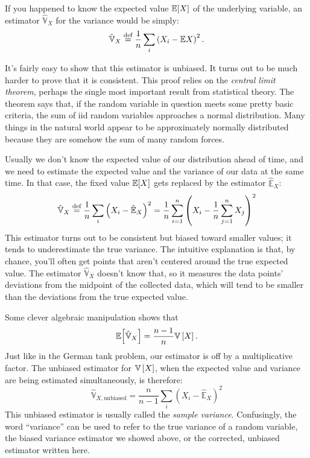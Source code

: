 If you happened to know the expected value $\mathbb{E}\!\left[{X}\right]$ of the underlying
variable, an estimator $\hat{\mathbb{V}}_X$ for the variance would be simply:
\begin{equation}
  \hat{\mathbb{V}}_X \stackrel{\text{def}}{=} \frac{1}{n} \sum_i \left( X_i - \mathbb{E}X \right)^2.
\end{equation}

It's fairly easy to show that this estimator is unbiased. It turns out to be
much harder to prove that it is consistent. This proof relies on the
\emph{central limit theorem}, perhaps the single most important result from
statistical theory. The theorem says that, if the random variable in question
meets some pretty basic criteria, the sum of iid random variables approaches a
normal distribution. Many things in the natural world appear to be
approximately normally distributed because they are somehow the sum of many
random forces.

Usually we don't know the expected value of our distribution ahead of time,
and we need to estimate the expected value and the variance of our data at the
same time. In that case, the fixed value $\mathbb{E}\!\left[{X}\right]$ gets replaced by the
estimator $\hat{\mathbb{E}}_X$:
\begin{equation}
\hat{\mathbb{V}}_X \stackrel{\text{def}}{=} \frac{1}{n} \sum_i \left( X_i - \hat{\mathbb{E}}_X \right)^2
  = \frac{1}{n} \sum_{i=1}^n \left( X_i - \frac{1}{n} \sum_{j=1}^n X_j \right)^2
\end{equation}
This estimator turns out to be consistent but biased toward smaller values; it
tends to underestimate the true variance. The intuitive explanation is that,
by chance, you'll often get points that aren't centered around the true
expected value. The estimator $\hat{\mathbb{V}}_X$ doesn't know that, so it
measures the data points' deviations from the midpoint of the collected data,
which will tend to be smaller than the deviations from the true expected
value.

Some clever algebraic manipulation shows that
\begin{equation}
\mathbb{E}\!\left[{\hat{\mathbb{V}}_X}\right] = \frac{n-1}{n} \mathbb{V}\left[{X}\right].
\end{equation}
Just like in the German tank problem, our estimator is off by a multiplicative factor. The unbiased estimator for $\mathbb{V}\left[{X}\right]$, when the expected value and variance are being estimated simultaneously, is therefore:
\begin{equation}
\hat{\mathbb{V}}_{X,\text{unbiased}} = \frac{n}{n - 1} \sum_i \left( X_i - \hat{\mathbb{E}}_X \right)^2
\end{equation}
This unbiased estimator is usually called the \emph{sample variance}.
Confusingly, the word ``variance'' can be used to refer to the true variance
of a random variable, the biased variance estimator we showed above, or the
corrected, unbiased estimator written here.

